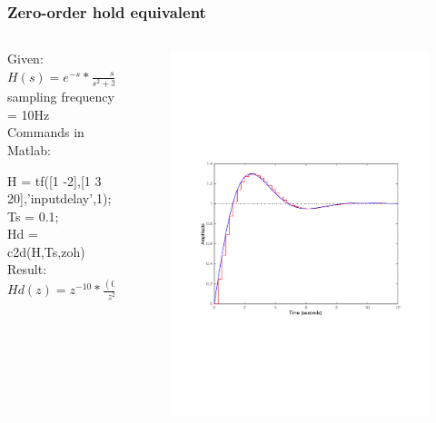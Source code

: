 \begin{frame}
	\frametitle{Zero-order hold equivalent}
\begin{columns}
	\begin{column}{0.6\textwidth}
	\begin{example}
		Given:\\
		$H(s) = e^{-s} * \frac{s-2}{s^{2} + 3*s + 20} $\\
		sampling frequency = 10Hz\\
		\vspace{1em}
		Commands in Matlab:
		
		H = tf([1 -2],[1 3 20],'inputdelay',1); \\
		Ts = 0.1; \\
		Hd = c2d(H,Ts,zoh)\\
		\vspace{1em}
		Result:
		$Hd(z) = z^{-10} * \frac{(0.07462*z - 0.09162)}{z^{2} - 1,571*z + 0.7408}$
	\end{example}
	\end{column}
	
	\begin{column}{0.4\textwidth}
		\begin{figure}
			\centering
			\includegraphics[width=1\linewidth]{vb1}
		\end{figure}
	\end{column}
\end{columns}
\end{frame}

